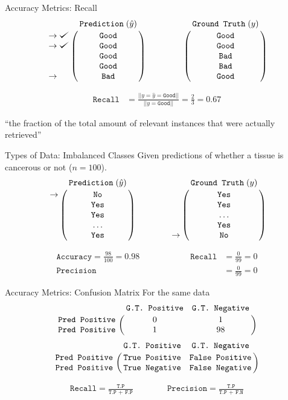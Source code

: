 \documentclass[usenames,dvipsnames]{beamer}
\def\checkmark{\tikz\fill[scale=0.4](0,.35) -- (.25,0) -- (1,.7) -- (.25,.15) -- cycle;}
\begin{document}
\begin{frame}{Accuracy Metrics: Recall}
$$
\bordermatrix{&\texttt{Prediction}\;(\hat{y})\cr
               \rightarrow\checkmark&\texttt{Good}\cr
               \rightarrow\checkmark&\texttt{Good}\cr
                &\texttt{Good}\cr
                &\texttt{Good}\cr
               \rightarrow&\texttt{Bad}}
\qquad \qquad
\bordermatrix{&\texttt{Ground Truth}\;(y)\cr
                &\texttt{Good}\cr
                &\texttt{Good}\cr
                &\texttt{Bad}\cr
                &\texttt{Bad}\cr
                &\texttt{Good}}
$$

\begin{align*}
\texttt{Recall} &= \frac{||y = \hat{y} = \texttt{Good}||}{||y = \texttt{Good}||} = \frac{2}{3} = 0.67
\end{align*}

``the fraction of the total amount of relevant instances that were actually retrieved''

\end{frame}

\begin{frame}{Types of Data: Imbalanced Classes}
Given predictions of whether a tissue is cancerous or not ($n = 100$).
$$
\bordermatrix{&\texttt{Prediction}\;(\hat{y})\cr
               \rightarrow&\texttt{No}\cr
               &\texttt{Yes}\cr
                &\texttt{Yes}\cr
                &\ldots\cr
               &\texttt{Yes}}
\qquad \qquad
\bordermatrix{&\texttt{Ground Truth}\;(y)\cr
                &\texttt{Yes}\cr
                &\texttt{Yes}\cr
                &\ldots\cr
                &\texttt{Yes}\cr
                \rightarrow&\texttt{No}}
$$

\pause 
\begin{align*}
\texttt{Accuracy} = \frac{98}{100} = 0.98 \qquad \qquad \qquad
\texttt{Recall} &= \frac{0}{99} = 0 \\
\texttt{Precision} &= \frac{0}{99} = 0
\end{align*}


\end{frame}

\begin{frame}{Accuracy Metrics: Confusion Matrix}
For the same data
\pause $$
\bordermatrix{&\texttt{G.T. Positive}&\texttt{G.T. Negative}\cr
               \texttt{Pred Positive}&0&1\cr
               \texttt{Pred Positive}&1&98}
$$
\pause $$
\bordermatrix{&\texttt{G.T. Positive}&\texttt{G.T. Negative}\cr
               \texttt{Pred Positive}&\texttt{True Positive}&\texttt{False Positive}\cr
               \texttt{Pred Positive}&\texttt{True Negative}&\texttt{False Negative}}
$$


\pause \begin{align*}
\texttt{Recall} = \frac{\texttt{T.P}}{\texttt{T.P + F.P}} \qquad \qquad 
\texttt{Precision} = \frac{\texttt{T.P}}{\texttt{T.P + F.N}}
\end{align*}
\end{frame}
\end{document}
